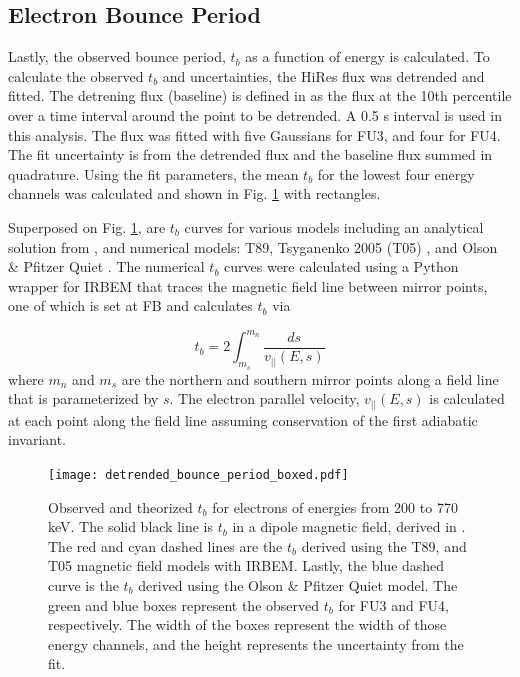 \documentclass[draft,linenumbers]{agujournal}
\begin{document}
\subsection{Electron Bounce Period} \label{t_b} %
Lastly, the observed bounce period, $t_b$ as a function of energy is calculated. To calculate the observed $t_b$ and uncertainties, the HiRes flux was detrended and fitted. The detrening flux (baseline) is defined in \citet{O'Brien04} as the flux at the 10th percentile over a time interval around the point to be detrended. A 0.5 s interval is used in this analysis. The flux was fitted with five Gaussians for FU3, and four for FU4. The fit uncertainty is from the detrended flux and the baseline flux summed in quadrature. Using the fit parameters, the mean $t_b$ for the lowest four energy channels was calculated and shown in Fig. \ref{tb_plot} with rectangles. 

Superposed on Fig. \ref{tb_plot}, are $t_b$ curves for various models including an analytical solution from \citet{Schulz74}, and numerical models: T89, Tsyganenko 2005 (T05) \citep{Tsyganenko05}, and Olson \& Pfitzer Quiet \citep{Olson82}. The numerical $t_b$ curves were calculated using a Python wrapper for IRBEM that traces the magnetic field line between mirror points, one of which is set at FB and calculates $t_b$ via 

\begin{equation}
t_b = 2 \int_{m_s}^{m_n}  \frac{ds}{v_{||}(E, s)}
\end{equation} where $m_n$ and $m_s$ are the northern and southern mirror points along a field line that is parameterized by $s$. The electron parallel velocity, $v_{||}(E, s)$ is calculated at each point along the field line assuming conservation of the first adiabatic invariant.

\begin{figure}
\texttt{[image: detrended\_bounce\_period\_boxed.pdf]}
\caption{Observed and theorized $t_b$ for electrons of energies from 200 to 770 keV. The solid black line is $t_b$ in a dipole magnetic field, derived in \citet{Schulz74}. The red and cyan dashed lines are the $t_b$ derived using the T89, and T05 magnetic field models with IRBEM. Lastly, the blue dashed curve is the $t_b$ derived using the Olson \& Pfitzer Quiet model. The green and blue boxes represent the observed $t_b$ for FU3 and FU4, respectively. The width of the boxes represent the width of those energy channels, and the height represents the uncertainty from the fit.}
\label{tb_plot}
\end{figure}
\end{document}
